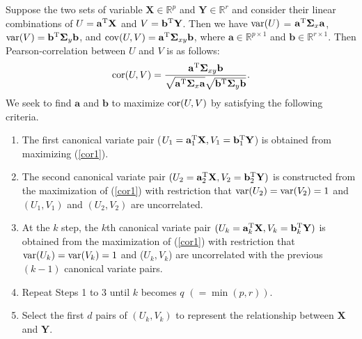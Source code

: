 Suppose the two sets of variable $\mathbf{X} \in \mathbb{R}^p$ and
$\mathbf{Y} \in \mathbb{R}^r$ and
consider their linear combinations of
$U=\mathbf{a}^{{\rm {T}}}\mathbf{X}$ and
$V=\mathbf{b}^{{\rm {T}}}\mathbf{Y}$.
Then we have ${\rm var}(U)$ = $\mathbf{a}^{{\rm {T}}}
{\boldsymbol\Sigma}_x \mathbf{a}$,
${\rm var}(V)=\mathbf{b}^{{\rm {T}}}{\boldsymbol\Sigma}_y \mathbf{b}$, and
${\rm cov}(U,V)=\mathbf{a}^{{\rm {T}}}{\boldsymbol\Sigma}_{xy} \mathbf{b}$,
where $\mathbf{a}\in\mathbb{R}^{p \times 1}$ and
$\mathbf{b}\in\mathbb{R}^{r \times 1}$.
Then Pearson-correlation between $U$ and $V$ is as follows:
%
\begin{equation}
\label{cor1}
{\rm cor}(U,V)=\frac{\mathbf{a}^{{\rm {T}}}
\boldsymbol{\Sigma}_{xy}\mathbf{b}}
{\sqrt{\mathbf{a}^{{\rm {T}}}\boldsymbol{\Sigma}_x\mathbf{a}}
\sqrt{\mathbf{b}^{{\rm {T}}}\boldsymbol{\Sigma}_y\mathbf{b}}}.
\end{equation}
%
We seek to find $\mathbf{a}$ and $\mathbf{b}$
to maximize ${\rm cor}(U,V)$ by satisfying the following criteria.
%
\begin{enumerate}
\item The first canonical variate pair
($U_1 = \mathbf{a}_1^{{\rm {T}}}\mathbf{X},
V_1=\mathbf{b}_1^{{\rm {T}}}\mathbf{Y}$)
is obtained from maximizing (\ref{cor1}).

\item The second canonical variate pair
$(U_2 = \mathbf{a}_2^{{\rm {T}}}\mathbf{X},
V_2 = \mathbf{b}_2^{{\rm {T}}}\mathbf{Y})$
is constructed from the maximization of (\ref{cor1})
with restriction that
${\rm var}(U_2) = {\rm var}(V_2)=1$ and $(U_1, V_1)$ and $(U_2, V_2)$
are uncorrelated.

\item At the $k$ step, the $k$th canonical variate pair
$(U_k=\mathbf{a}_k^{{\rm {T}}}\mathbf{X}, V_k=\mathbf{b}_k^{{\rm {T}}}\mathbf{Y})$
is obtained from the maximization of (\ref{cor1})
with restriction that ${\rm var}(U_k) = {\rm var}(V_k)=1$ and ($U_k, V_k$)
are uncorrelated with the previous $(k-1)$ canonical variate pairs.

\item Repeat Steps 1 to 3 until $k$ becomes $q$ $(=\min(p,r))$.

\item Select the first $d$ pairs of $(U_k, V_k)$
 to represent the relationship between $\mathbf{X}$ and $\mathbf{Y}$.
\end{enumerate}
%

